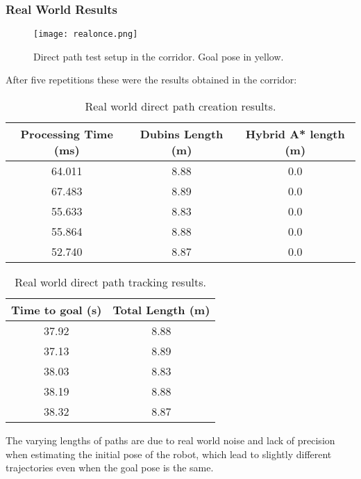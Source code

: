 \clearpage
\subsubsection{Real World Results}
\begin{figure}[h]
    \centering
    \texttt{[image: realonce.png]}
    \caption{Direct path test setup in the corridor. Goal pose in yellow.}
    \label{fig:real1}
\end{figure}

After five repetitions these were the results obtained in the corridor:
\begin{table}[H]
    \centering
    \begin{tabular}{|c|c|c|}
        \hline
        \textbf{Processing Time (ms)} & \textbf{Dubins Length (m)} & \textbf{Hybrid A* length (m)} \\
        \hline
         64.011 & 8.88 & 0.0 \\
        \hline
         67.483 & 8.89 & 0.0 \\
         \hline
         55.633 & 8.83 & 0.0 \\
         \hline
         55.864 & 8.88 & 0.0 \\
         \hline
         52.740 & 8.87 & 0.0 \\
         \hline
    \end{tabular}
    \caption{Real world direct path creation results.}
    \label{tab:direct_path_results3}
    
\end{table}
\begin{table}[H]
    \centering
    \begin{tabular}{|c|c|}
        \hline
        \textbf{Time to goal (s)} & \textbf{Total Length (m)} \\
        \hline
        37.92 & 8.88 \\
        \hline
        37.13 & 8.89 \\
         \hline
         38.03 & 8.83 \\
         \hline
         38.19 & 8.88 \\
         \hline
         38.32 & 8.87 \\
         \hline
    \end{tabular}
    \caption{Real world direct path tracking results.}
    \label{tab:direct_path_results4}
\end{table}

The varying lengths of paths are due to real world noise and lack of precision when 
estimating the initial pose of the robot, which lead to slightly different trajectories 
even when the goal pose is the same.
\clearpage

